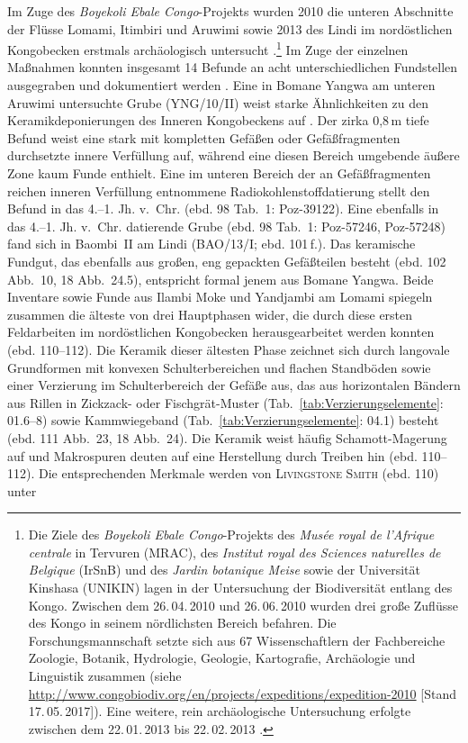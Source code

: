 Im Zuge des \textit{Boyekoli Ebale Congo}-Projekts wurden 2010 die unteren Abschnitte der Flüsse Lomami, Itimbiri und Aruwimi sowie 2013 des Lindi im nordöstlichen Kongobecken erstmals archäologisch untersucht \parencite[96]{LivingstoneSmith.2017}.\footnote{Die Ziele des \textit{Boyekoli Ebale Congo}-Projekts des \textit{Musée royal de l'Afrique centrale} in Tervuren (MRAC), des \textit{Institut royal des Sciences naturelles de Belgique} (IrSnB) und des \textit{Jardin botanique Meise} sowie der Universität Kinshasa (UNIKIN) lagen in der Untersuchung der Biodiversität entlang des Kongo. Zwischen dem 26.\,04.\,2010 und 26.\,06.\,2010 wurden drei große Zuflüsse des Kongo in seinem nördlichsten Bereich befahren. Die Forschungsmannschaft setzte sich aus 67 Wissenschaftlern der Fachbereiche Zoologie, Botanik, Hydrologie, Geologie, Kartografie, Archäologie und Linguistik zusammen (siehe \url{http://www.congobiodiv.org/en/projects/expeditions/expedition-2010} [Stand 17.\,05.\,2017]). Eine weitere, rein archäologische Untersuchung erfolgte zwischen dem 22.\,01.\,2013 bis 22.\,02.\,2013 \parencites[siehe][]{LivingstoneSmith.2011}{Cornelissen.2013}.\label{ftn:BoyekoliEbaleCongo}\linebreak} Im Zuge der einzelnen Maßnahmen konnten insgesamt 14 Befunde an acht unterschiedlichen Fundstellen ausgegraben und dokumentiert werden \parencite[98 Tab.~1]{LivingstoneSmith.2017}. Eine in Bomane Yangwa am unteren Aruwimi untersuchte Grube (YNG/10/II) weist starke Ähnlichkeiten zu den Keramikdeponierungen des Inneren Kongobeckens auf \parencites[13 Abb.~2]{LivingstoneSmith.2011}[siehe][]{Wotzka.1993}. Der zirka 0,8\,m tiefe Befund weist eine stark mit kompletten Gefäßen oder Gefäßfragmenten \parencites[siehe][14 Abb.~3]{LivingstoneSmith.2011}[112 Abb.~24.4]{LivingstoneSmith.2017} durchsetzte innere Verfüllung auf, während eine diesen Bereich umgebende äußere Zone kaum Funde enthielt. Eine im unteren Bereich der an Gefäßfragmenten reichen inneren Verfüllung entnommene Radiokohlenstoffdatierung stellt den Befund in das 4.--1. Jh. v.~Chr. (ebd. 98 Tab.~1: Poz-39122). Eine ebenfalls in das 4.--1. Jh. v.~Chr. datierende Grube (ebd. 98 Tab.~1: Poz-57246, Poz-57248) fand sich in Baombi~II am Lindi (BAO/13/I; ebd. 101\,f.). Das keramische Fundgut, das ebenfalls aus großen, eng gepackten Gefäßteilen besteht (ebd. 102 Abb.~10, 18 Abb.~24.5), entspricht formal jenem aus Bomane Yangwa. Beide Inventare sowie Funde aus Ilambi Moke und Yandjambi am Lomami spiegeln zusammen die älteste von drei Hauptphasen wider, die durch diese ersten Feldarbeiten im nordöstlichen Kongobecken herausgearbeitet werden konnten (ebd. 110--112). Die Keramik dieser ältesten Phase zeichnet sich durch langovale Grundformen mit konvexen Schulterbereichen und flachen Standböden sowie einer Verzierung im Schulterbereich der Gefäße aus, das aus horizontalen Bändern aus Rillen in Zickzack- oder Fischgrät-Muster (Tab.~\ref{tab:Verzierungselemente}: 01.6--8) sowie Kammwiegeband (Tab.~\ref{tab:Verzierungselemente}: 04.1) besteht (ebd. 111 Abb.~23, 18 Abb.~24). Die Keramik weist häufig Schamott-Magerung auf und Makrospuren deuten auf eine Herstellung durch Treiben hin (ebd. 110--112). Die entsprechenden Merkmale werden von \textsc{\mbox{Livingstone} \mbox{Smith}} (ebd. 110) unter 